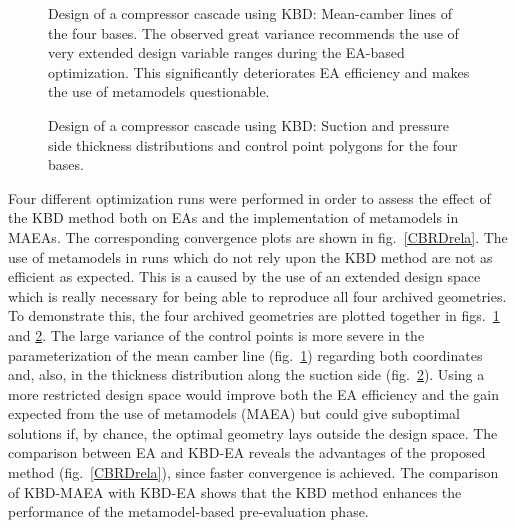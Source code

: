 \begin{figure}[h!]
\begin{minipage}[b]{1\linewidth}
 \centering
\end{minipage}
\caption{Design of a compressor cascade using KBD: Mean-camber lines of the four bases. The observed great variance recommends the use of very extended design variable ranges during the EA-based optimization. This significantly deteriorates EA efficiency and makes the use of metamodels questionable. } 
\label{CBRDmm}
\end{figure}

\begin{figure}[h!]
\begin{minipage}[b]{1\linewidth}
 \centering
\end{minipage}
\caption{Design of a compressor cascade using KBD: Suction and pressure side thickness distributions and control point polygons for the four bases.} 
\label{CBRDtt}
\end{figure}


Four different optimization runs were performed in order to assess the effect of the KBD method both on EAs and the implementation of metamodels in MAEAs. The corresponding convergence plots are shown in fig.\ \ref{CBRDrela}. The use of metamodels in runs which do not rely upon the KBD method are not as efficient as expected. This is a caused by the use of an extended design space which is really necessary for being able to reproduce all four archived geometries. To demonstrate this, the four archived geometries are plotted together in figs.\ \ref{CBRDmm} and \ref{CBRDtt}. The large variance of the control points is more severe in the parameterization of the mean camber line (fig.\ \ref{CBRDmm}) regarding both coordinates and, also, in the thickness distribution along the suction side (fig.\ \ref{CBRDtt}). Using a more restricted design space would improve both the EA efficiency and the gain expected from the use of metamodels (MAEA) but could give suboptimal solutions if, by chance, the optimal geometry lays outside the design space. The comparison between EA and KBD-EA reveals the advantages of the proposed method (fig.\ \ref{CBRDrela}), since faster convergence is achieved. The comparison of KBD-MAEA with KBD-EA shows that the KBD method enhances the performance of the metamodel-based pre-evaluation phase. 

